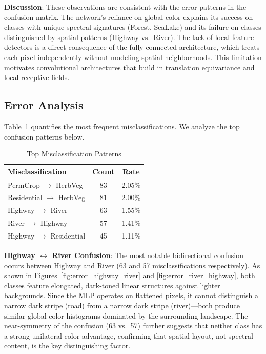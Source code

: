 \documentclass[sigconf,nonacm]{acmart}
\begin{document}
\textbf{Discussion}:
These observations are consistent with the error patterns in the confusion matrix. The network's reliance on global color explains its success on classes with unique spectral signatures (Forest, SeaLake) and its failure on classes distinguished by spatial patterns (Highway vs.\ River). The lack of local feature detectors is a direct consequence of the fully connected architecture, which treats each pixel independently without modeling spatial neighborhoods. This limitation motivates convolutional architectures that build in translation equivariance and local receptive fields.

\subsection{Error Analysis}

Table~\ref{tab:errors} quantifies the most frequent misclassifications. We analyze the top confusion patterns below.

\begin{table}[htbp]
\caption{Top Misclassification Patterns}
\label{tab:errors}
\centering
\small
\begin{tabular}{lcc}
\toprule
Misclassification & Count & Rate \\
\midrule
PermCrop $\rightarrow$ HerbVeg & 83 & 2.05\% \\
Residential $\rightarrow$ HerbVeg & 81 & 2.00\% \\
Highway $\rightarrow$ River & 63 & 1.55\% \\
River $\rightarrow$ Highway & 57 & 1.41\% \\
Highway $\rightarrow$ Residential & 45 & 1.11\% \\
\bottomrule
\end{tabular}
\end{table}

\textbf{Highway $\leftrightarrow$ River Confusion}: The most notable bidirectional confusion occurs between Highway and River (63 and 57 misclassifications respectively). As shown in Figures~\ref{fig:error_highway_river} and \ref{fig:error_river_highway}, both classes feature elongated, dark-toned linear structures against lighter backgrounds. Since the MLP operates on flattened pixels, it cannot distinguish a narrow dark stripe (road) from a narrow dark stripe (river)---both produce similar global color histograms dominated by the surrounding landscape. The near-symmetry of the confusion (63 vs.\ 57) further suggests that neither class has a strong unilateral color advantage, confirming that spatial layout, not spectral content, is the key distinguishing factor.
\end{document}
